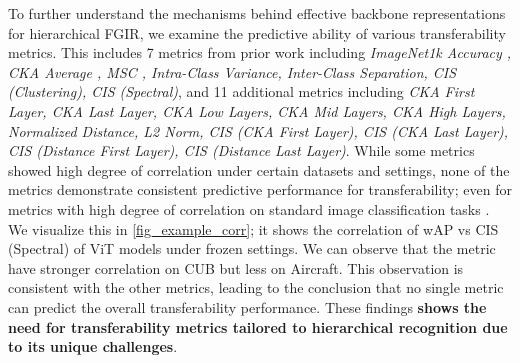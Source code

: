 \documentclass[sigconf, screen, review, anonymous]{acmart}
\begin{document}
To further understand the mechanisms behind effective backbone representations for hierarchical FGIR, we examine the predictive ability of various transferability metrics. This includes 7 metrics from prior work \cite{kornblith_better_2019, nayman_diverse_2022} including \textit{ImageNet1k Accuracy \cite{kornblith_better_2019}, CKA Average \cite{kornblith_why_2021}, MSC \cite{rousseeuw_silhouettes_1987}, Intra-Class Variance\cite{islam_broad_2021}, Inter-Class Separation\cite{islam_broad_2021}, CIS (Clustering)\cite{nayman_diverse_2022}, CIS (Spectral)\cite{nayman_diverse_2022}}, and 11 additional metrics including \textit{CKA First Layer, CKA Last Layer, CKA Low Layers, CKA Mid Layers, CKA High Layers, Normalized Distance, L2 Norm, CIS (CKA First Layer), CIS (CKA Last Layer), CIS (Distance First Layer), CIS (Distance Last Layer)}.  While some metrics showed high degree of correlation under certain datasets and settings, none of the metrics demonstrate consistent predictive performance for transferability; even for metrics with high degree of correlation on standard image classification tasks \cite{kornblith_better_2019, kornblith_why_2021, nayman_diverse_2022}. We visualize this in \cref{fig_example_corr}; it shows the correlation of wAP vs CIS (Spectral) \cite{nayman_diverse_2022} of ViT models under frozen settings. We can observe that the metric have stronger correlation on CUB but less on Aircraft. This observation is consistent with the other metrics, leading to the conclusion that no single metric can predict the overall transferability performance. These findings \textbf{shows the need for transferability metrics tailored to hierarchical recognition due to its unique challenges}.
\end{document}
